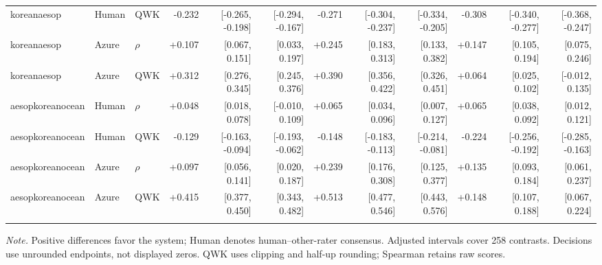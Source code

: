 \begin{landscape}
\begin{longtable}{@{}lllrrrrrrrrr@{}}
koreanaesop & Human & QWK & -0.232 & [-0.265, -0.198] & [-0.294, -0.167] & -0.271 & [-0.304, -0.237] & [-0.334, -0.205] & -0.308 & [-0.340, -0.277] & [-0.368, -0.247]\\
koreanaesop & Azure & $\rho$ & +0.107 & [0.067, 0.151] & [0.033, 0.197] & +0.245 & [0.183, 0.313] & [0.133, 0.382] & +0.147 & [0.105, 0.194] & [0.075, 0.246]\\
koreanaesop & Azure & QWK & +0.312 & [0.276, 0.345] & [0.245, 0.376] & +0.390 & [0.356, 0.422] & [0.326, 0.451] & +0.064 & [0.025, 0.102] & [-0.012, 0.135]\\
\addlinespace[2pt]
aesopkoreanocean & Human & $\rho$ & +0.048 & [0.018, 0.078] & [-0.010, 0.109] & +0.065 & [0.034, 0.096] & [0.007, 0.127] & +0.065 & [0.038, 0.092] & [0.012, 0.121]\\
aesopkoreanocean & Human & QWK & -0.129 & [-0.163, -0.094] & [-0.193, -0.062] & -0.148 & [-0.183, -0.113] & [-0.214, -0.081] & -0.224 & [-0.256, -0.192] & [-0.285, -0.163]\\
aesopkoreanocean & Azure & $\rho$ & +0.097 & [0.056, 0.141] & [0.020, 0.187] & +0.239 & [0.176, 0.308] & [0.125, 0.377] & +0.135 & [0.093, 0.184] & [0.061, 0.237]\\
aesopkoreanocean & Azure & QWK & +0.415 & [0.377, 0.450] & [0.343, 0.482] & +0.513 & [0.477, 0.546] & [0.443, 0.576] & +0.148 & [0.107, 0.188] & [0.067, 0.224]\\
\addlinespace[2pt]
\end{longtable}
\noindent\textit{Note.} Positive differences favor the system; Human denotes human--other-rater consensus. Adjusted intervals cover 258 contrasts. Decisions use unrounded endpoints, not displayed zeros. QWK uses clipping and half-up rounding; Spearman retains raw scores.
\endgroup
\end{landscape}
